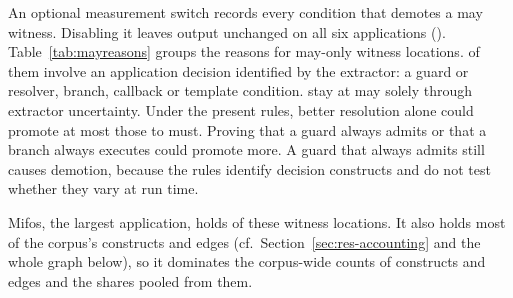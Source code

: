 An optional measurement switch records every condition that demotes a may witness. Disabling it
leaves output unchanged on all six applications ().
Table~\ref{tab:mayreasons} groups the reasons for \MayOnlyConstructs{} may-only witness locations.
\MayAppAny{} of them involve an application decision identified by the extractor: a guard or resolver,
branch, callback or template condition. \MayToolOnly{} stay at may solely through
extractor uncertainty. Under the present rules, better resolution alone could promote at
most those to must. Proving that a guard always admits or that a branch always executes could
promote more. A guard that always
admits still causes demotion, because the rules identify decision constructs and do not test
whether they vary at run time.

Mifos, the largest application, holds \MayOnlyConstructsMifos{} of these \MayOnlyConstructs{}
witness locations. It also holds most of the corpus's constructs and edges
(cf.~Section~\ref{sec:res-accounting} and the whole graph below), so it dominates the corpus-wide
counts of constructs and edges and the shares pooled from them.

\begin{table}[t]\small
\caption{Must conversion per application, baseline.}
\label{tab:conversion}
\TabConversion
\par{}
\end{table}

\begin{table}[t]\footnotesize
\caption{Why the may-only witness locations are may, by family of reason.}
\label{tab:mayreasons}
\TabMayReasons
\par{}
\end{table}

